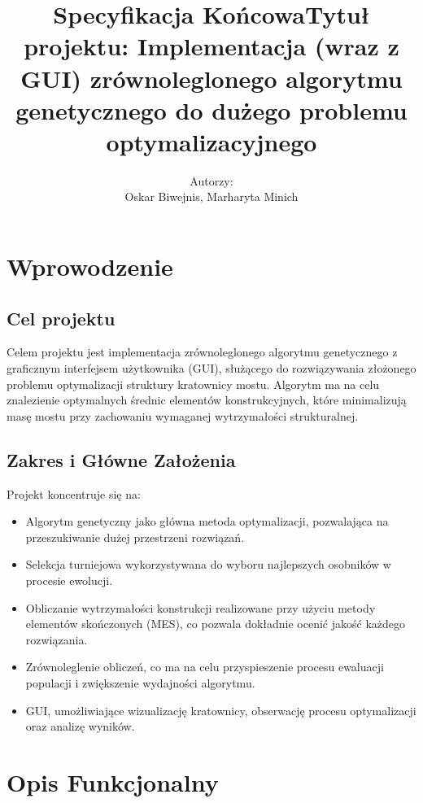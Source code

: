 \documentclass[12pt,a4paper]{article}
\title{\textbf{Specyfikacja Końcowa}}
\title{Tytuł projektu: Implementacja (wraz z GUI) zrównoleglonego algorytmu genetycznego do dużego problemu optymalizacyjnego }
\author{Autorzy:\\Oskar Biwejnis, Marharyta Minich}
\begin{document}
\maketitle

 

\section{Wprowodzenie}

\subsection{Cel projektu}
 Celem projektu jest implementacja zrównoleglonego algorytmu genetycznego z graficznym interfejsem użytkownika (GUI), służącego do rozwiązywania złożonego problemu optymalizacji struktury kratownicy mostu. Algorytm ma na celu znalezienie optymalnych średnic elementów konstrukcyjnych, które minimalizują masę mostu przy zachowaniu wymaganej wytrzymałości strukturalnej.

\subsection{Zakres i Główne Założenia }
Projekt koncentruje się na:
\begin{itemize}
    \item Algorytm genetyczny jako główna metoda optymalizacji, pozwalająca na przeszukiwanie dużej przestrzeni rozwiązań.

    \item Selekcja turniejowa wykorzystywana do wyboru najlepszych osobników w procesie ewolucji.

    \item Obliczanie wytrzymałości konstrukcji realizowane przy użyciu metody elementów skończonych (MES), co pozwala dokładnie ocenić jakość każdego rozwiązania.

    \item Zrównoleglenie obliczeń, co ma na celu przyspieszenie procesu ewaluacji populacji i zwiększenie wydajności algorytmu.

   \item GUI, umożliwiające wizualizację kratownicy, obserwację procesu optymalizacji oraz analizę wyników.
    
\end{itemize}

\section{Opis Funkcjonalny}
\end{document}
